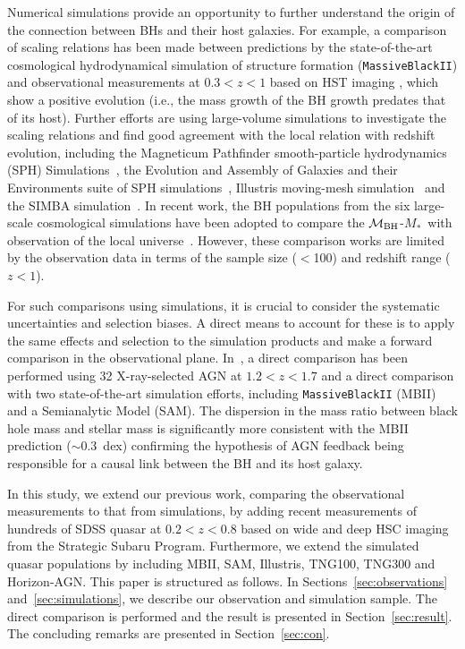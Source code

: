 \documentclass[twocolumn]{aastex631}
\def\smass{{$M_*$}}
\def\mbh{$\mathcal M_{\rm BH}$}
\begin{document}
Numerical simulations provide an opportunity to further understand the origin of the connection between BHs and their host galaxies. For example, a comparison of scaling relations has been made between predictions by the state-of-the-art cosmological hydrodynamical simulation of structure formation ({\tt MassiveBlackII}) and observational measurements at  $0.3<z<1$ based on HST imaging \citep[e.g., ][]{DeG++15}, which show a positive evolution (i.e., the mass growth of the BH growth predates that of its host). Further efforts are using large-volume simulations to investigate the scaling relations and find good agreement with the local relation with redshift evolution, including the Magneticum Pathfinder smooth-particle hydrodynamics (SPH) Simulations~\citep{Steinborn2015}, the Evolution and Assembly of Galaxies and their Environments suite of SPH simulations~\citep{Schaye2015}, Illustris moving-mesh simulation~\citep{Sijacki2015, Vogelsberger2014, Li2019} and the SIMBA simulation~\citep{Thomas2019}. In recent work, the BH populations from the six large-scale cosmological simulations have been adopted to compare the \mbh-\smass\ with observation of the local universe~\citep{Habouzit2021}. However, these comparison works are limited by the observation data in terms of the sample size ($<$100) and redshift range ($z<1$).

For such comparisons using simulations, it is crucial to consider the systematic uncertainties and selection biases. A direct means to account for these is to apply the same effects and selection to the simulation products and make a forward comparison in the observational plane. In~\citet{Ding2020b}, a direct comparison has been performed using 32 X-ray-selected AGN at $1.2<z<1.7$ and a direct comparison with two state-of-the-art simulation efforts, including {\tt MassiveBlackII} (MBII) and a Semianalytic Model (SAM). The dispersion in the mass ratio between black hole mass and stellar mass is significantly more consistent with the MBII prediction ($\sim0.3$~dex) confirming the hypothesis of AGN feedback being responsible for a causal link between the BH and its host galaxy.

In this study, we extend our previous work, comparing the observational measurements to that from simulations, by adding recent measurements of hundreds of SDSS quasar at $0.2<z<0.8$ based on wide and deep HSC imaging from the Strategic Subaru Program. Furthermore, we extend the simulated quasar populations by including MBII, SAM, Illustris, TNG100, TNG300 and Horizon-AGN. This paper is structured as follows. In Sections~\ref{sec:observations} and~\ref{sec:simulations}, we describe our observation and simulation sample. The direct comparison is performed and the result is presented in Section~\ref{sec:result}. The concluding remarks are presented in Section~\ref{sec:con}.
\end{document}
